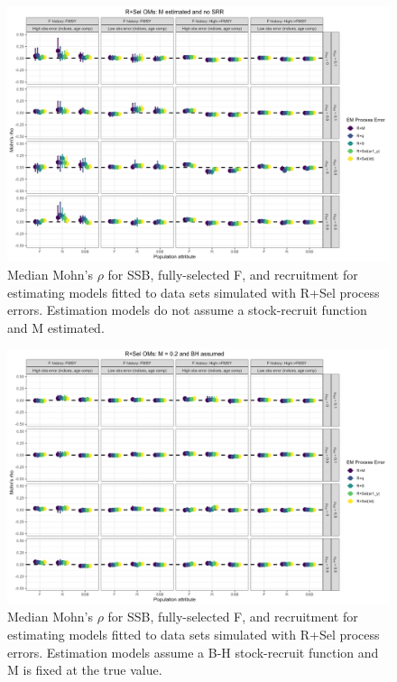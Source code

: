 \documentclass[
  12pt,
]{article}
\begin{document}
\begin{landscape}
\begin{figure}
\caption{Median Mohn's $\rho$ for SSB, fully-selected F, and recruitment for estimating models fitted to data sets simulated with R+Sel process errors.  Estimation models do not assume a stock-recruit function and M estimated.}\label{Sel_om_em_R_ME_mohns_rho}
\begin{center}
\includegraphics[width = \textwidth]{Sel_om_mohns_rho_R_ME.png}
\end{center}
\end{figure}
\end{landscape}

\begin{landscape}
\begin{figure}
\caption{Median Mohn's $\rho$ for SSB, fully-selected F, and recruitment for estimating models fitted to data sets simulated with R+Sel process errors.  Estimation models assume a B-H stock-recruit function and M is fixed at the true value.}\label{Sel_om_em_BH_MF_mohns_rho}
\begin{center}
\includegraphics[width = \textwidth]{Sel_om_mohns_rho_BH_MF.png}
\end{center}
\end{figure}
\end{landscape}
\end{document}
